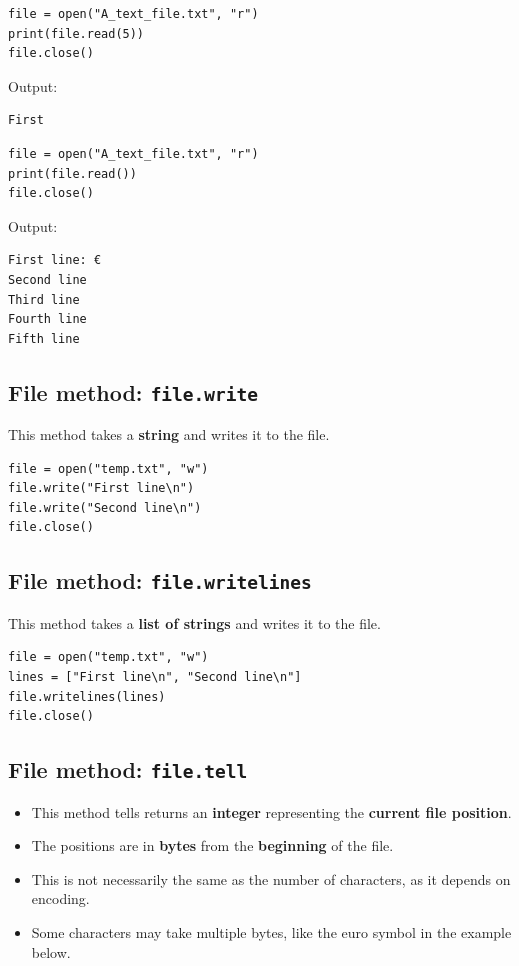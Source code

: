 \documentclass[11pt]{article}
\begin{document}
\begin{verbatim}
file = open("A_text_file.txt", "r")
print(file.read(5))
file.close()
\end{verbatim}

 \noindent Output:

\begin{verbatim}
First
\end{verbatim}


\begin{verbatim}
file = open("A_text_file.txt", "r")
print(file.read())
file.close()
\end{verbatim}

 \noindent Output:

\begin{verbatim}
First line: €
Second line
Third line
Fourth line
Fifth line

\end{verbatim}

\subsection{File method: \texttt{file.write}}
\label{sec:org25571e5}
This method takes a \textbf{string} and writes it to the file.
\begin{verbatim}
file = open("temp.txt", "w")
file.write("First line\n")
file.write("Second line\n")
file.close()
\end{verbatim}

\subsection{File method: \texttt{file.writelines}}
\label{sec:orgcb7c685}
This method takes a \textbf{list of strings} and writes it to the file.
\begin{verbatim}
file = open("temp.txt", "w")
lines = ["First line\n", "Second line\n"]
file.writelines(lines)
file.close()
\end{verbatim}

\subsection{File method: \texttt{file.tell}}
\label{sec:org7a2091c}
\begin{itemize}
\item This method tells returns an \textbf{integer} representing the \textbf{current file position}.
\item The positions are in \textbf{bytes} from the \textbf{beginning} of the file.
\item This is not necessarily the same as the number of characters, as it depends on encoding.
\item Some characters may take multiple bytes, like the euro symbol in the example below.
\end{itemize}
\end{document}
